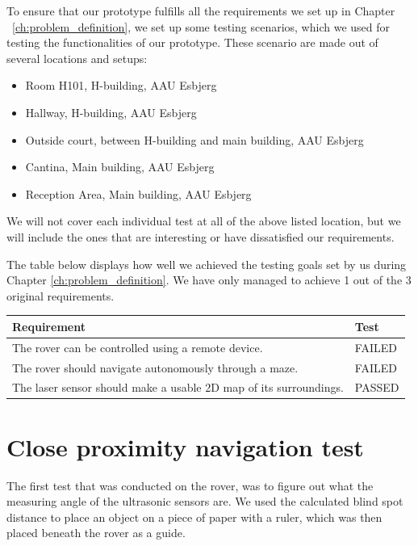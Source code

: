 To ensure that our prototype fulfills all the requirements we set up in Chapter ~\ref{ch:problem_definition}, we set up some testing scenarios, which we used for testing the functionalities of our prototype. These scenario are made out of several locations and setups:
\begin{itemize}
	\item Room H101, H-building, AAU Esbjerg
	\item Hallway, H-building, AAU Esbjerg
	\item Outside court, between H-building and main building, AAU Esbjerg
	\item Cantina, Main building, AAU Esbjerg
	\item Reception Area, Main building, AAU Esbjerg
\end{itemize}

We will not cover each individual test at all of the above listed location, but we will include the ones that are interesting or have dissatisfied our requirements.

The table below displays how well we achieved the testing goals set by us during Chapter \ref{ch:problem_definition}. We have only managed to achieve 1 out of the 3 original requirements.

\begin{table}[H]
	\centering
	\begin{tabular}{|l|l|}
		\hline
		\textbf{Requirement} & \textbf{Test} \\ \hline
		The rover can be controlled using a remote device. & FAILED \\ \hline
		The rover should navigate autonomously through a maze. & FAILED \\ \hline
		The laser sensor should make a usable 2D map of its surroundings. & PASSED\\ \hline
	\end{tabular}
\end{table}

\clearpage
\section{Close proximity navigation test}

The first test that was conducted on the rover, was to figure out what the measuring angle of the ultrasonic sensors are. We used the calculated blind spot distance to place an object on a piece of paper with a ruler, which was then placed beneath the rover as a guide.

